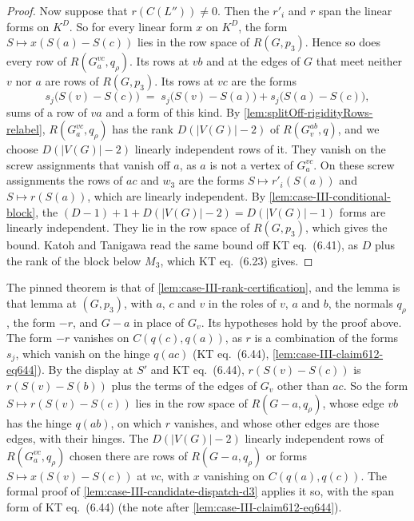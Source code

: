 \begin{proof}
  Now suppose that $r(C(L'')) \neq 0$. Then the $r'_i$ and $r$ span the
  linear forms on $K^D$. So for every linear form $x$ on $K^D$, the form
  $S \mapsto x(S(a) - S(c))$ lies in the row space of $R(G, p_3)$. Hence
  so does every row of $R(G_a^{vc}, q_\rho)$. Its rows at $vb$ and at the
  edges of $G$ that meet neither $v$ nor $a$ are rows of $R(G, p_3)$. Its
  rows at $vc$ are the forms
  \[
    s_j\bigl(S(v) - S(c)\bigr) \;=\; s_j\bigl(S(v) - S(a)\bigr)
      + s_j\bigl(S(a) - S(c)\bigr),
  \]
  sums of a row of $va$ and a form of this kind. By
  \cref{lem:splitOff-rigidityRows-relabel}, $R(G_a^{vc}, q_\rho)$ has the
  rank $D(|V(G)| - 2)$ of $R(G_v^{ab}, q)$, and we choose
  $D(|V(G)| - 2)$ linearly independent rows of it. They vanish on the screw
  assignments that vanish off $a$, as $a$ is not a vertex of $G_a^{vc}$.
  On these screw assignments the rows of $ac$ and $w_3$ are the forms
  $S \mapsto r'_i(S(a))$ and $S \mapsto r(S(a))$, which are linearly
  independent. By \cref{lem:case-III-conditional-block}, the
  $(D - 1) + 1 + D(|V(G)| - 2) = D(|V(G)| - 1)$ forms are linearly
  independent. They lie in the row space of $R(G, p_3)$, which gives the
  bound. Katoh and Tanigawa read the same bound off KT eq.~(6.41), as $D$
  plus the rank of the block below $M_3$, which KT eq.~(6.23) gives.
\end{proof}

\begin{fmlnote}
  The pinned theorem is that of \cref{lem:case-III-rank-certification},
  and the lemma is that lemma at $(G, p_3)$, with $a$, $c$ and $v$ in the
  roles of $v$, $a$ and $b$, the normals $q_\rho$, the form $-r$, and
  $G - a$ in place of $G_v$. Its hypotheses hold by the proof above. The
  form $-r$ vanishes on $C(q(c), q(a))$, as $r$ is a combination of the
  forms $s_j$, which vanish on the hinge $q(ac)$ (KT eq.~(6.44),
  \cref{lem:case-III-claim612-eq644}). By the display at $S'$ and KT
  eq.~(6.44), $r(S(v) - S(c))$ is $r(S(v) - S(b))$ plus the terms of the
  edges of $G_v$ other than $ac$. So the form $S \mapsto r(S(v) - S(c))$
  lies in the row space of $R(G - a, q_\rho)$, whose edge $vb$ has the
  hinge $q(ab)$, on which $r$ vanishes, and whose other edges are those
  edges, with their hinges. The $D(|V(G)| - 2)$ linearly independent
  rows of $R(G_a^{vc}, q_\rho)$ chosen there are rows of
  $R(G - a, q_\rho)$ or forms $S \mapsto x(S(v) - S(c))$ at $vc$, with
  $x$ vanishing on $C(q(a), q(c))$. The formal proof of
  \cref{lem:case-III-candidate-dispatch-d3} applies it so, with the span
  form of KT eq.~(6.44) (the note after
  \cref{lem:case-III-claim612-eq644}).
\end{fmlnote}

